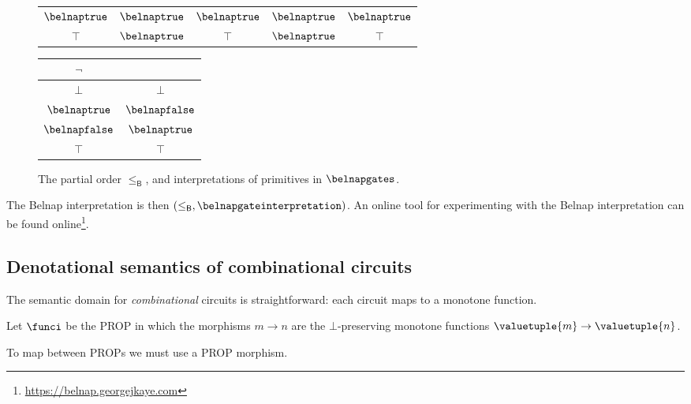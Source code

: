 \documentclass{lmcs}
\begin{document}
\begin{exa}
\begin{figure*}
\begin{tabular}{|c|cccc|}
            \(\belnaptrue\)  & \(\belnaptrue\) & \(\belnaptrue\)  & \(\belnaptrue\) & \(\belnaptrue\) \\
            \(\top\)         & \(\belnaptrue\) & \(\top\)         & \(\belnaptrue\) & \(\top\)        \\
            \hline
        \end{tabular}
        \quad
        \begin{tabular}{|c|c|}
            \hline
            \(\neg\)         &                  \\
            \hline
            \(\bot\)         & \(\bot\)         \\
            \(\belnaptrue\)  & \(\belnapfalse\) \\
            \(\belnapfalse\) & \(\belnaptrue\)  \\
            \(\top\)         & \(\top\)         \\
            \hline
        \end{tabular}
        \caption{
            The partial order \(\leq_\mathsf{B}\), and interpretations
            of primitives in \(\belnapgates\).
        }
        \label{fig:belnap-interpretation}
    \end{figure*}

    The Belnap interpretation is then \(
    (\leq_\mathsf{B}, \belnapgateinterpretation)
    \).
    An online tool for experimenting with the Belnap interpretation can be found
    online\footnote{\url{https://belnap.georgejkaye.com}}.
\end{exa}
\subsection{Denotational semantics of combinational circuits}

The semantic domain for \emph{combinational} circuits is straightforward: each
circuit maps to a monotone function.

\begin{defi}
    Let \(\funci\) be the PROP in which the morphisms
    \(m \to n\) are the \(\bot\)-preserving monotone
    functions \(\valuetuple{m} \to \valuetuple{n}\).
\end{defi}

To map between PROPs we must use a PROP morphism.
\end{document}

